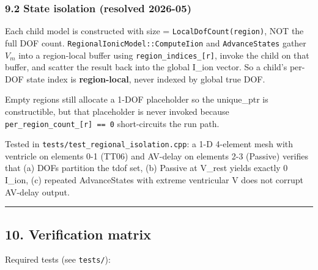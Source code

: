 \documentclass[
  11pt,
]{article}
\begin{document}
\hypertarget{state-isolation-resolved-2026-05}{%
\subsubsection{9.2 State isolation (resolved
2026-05)}\label{state-isolation-resolved-2026-05}}

Each child model is constructed with size =
\texttt{LocalDofCount(region)}, NOT the full DOF count.
\texttt{RegionalIonicModel::ComputeIion} and \texttt{AdvanceStates}
gather \(V_m\) into a region-local buffer using
\texttt{region\_indices\_{[}r{]}}, invoke the child on that buffer, and
scatter the result back into the global I\_ion vector. So a child's
per-DOF state index is \textbf{region-local}, never indexed by global
true DOF.

Empty regions still allocate a 1-DOF placeholder so the unique\_ptr is
constructible, but that placeholder is never invoked because
\texttt{per\_region\_count\_{[}r{]}\ ==\ 0} short-circuits the run path.

Tested in \texttt{tests/test\_regional\_isolation.cpp}: a 1-D 4-element
mesh with ventricle on elements 0-1 (TT06) and AV-delay on elements 2-3
(Passive) verifies that (a) DOFs partition the tdof set, (b) Passive at
V\_rest yields exactly 0 I\_ion, (c) repeated AdvanceStates with extreme
ventricular V does not corrupt AV-delay output.

\begin{center}\rule{0.5\linewidth}{0.5pt}\end{center}

\hypertarget{verification-matrix}{%
\subsection{10. Verification matrix}\label{verification-matrix}}

Required tests (see \texttt{tests/}):
\end{document}
